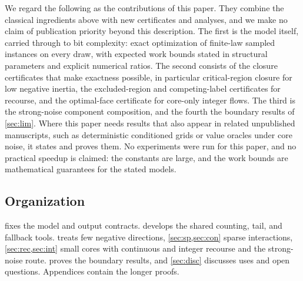 We regard the following as the contributions of this paper. They combine
the classical ingredients above with new certificates and analyses, and we
make no claim of publication priority beyond this description. The first is
the model itself, carried through to bit complexity: exact optimization of
finite-law sampled instances on every draw, with expected work bounds stated
in structural parameters and explicit numerical ratios. The second consists
of the closure certificates that make exactness possible, in particular
critical-region closure for low negative inertia, the excluded-region and
competing-label certificates for recourse, and the optimal-face certificate
for core-only integer flows. The third is the strong-noise component
composition, and the fourth the boundary results of \cref{sec:lim}. Where
this paper needs results that also appear in related unpublished
manuscripts, such as deterministic conditioned grids or value oracles under
core noise, it states and proves them. No experiments were run for this
paper, and no practical speedup is claimed: the constants are large, and the
work bounds are mathematical guarantees for the stated models.

\subsection{Organization}\label{sec:intro:organization}

 fixes the model and output contracts. 
develops the shared counting, tail, and fallback tools.  treats
few negative directions, \cref{sec:sp,sec:con} sparse interactions,
\cref{sec:rec,sec:int} small cores with continuous and integer recourse and
the strong-noise route.  proves the boundary results, and
\cref{sec:disc} discusses uses and open questions. Appendices contain the
longer proofs.
